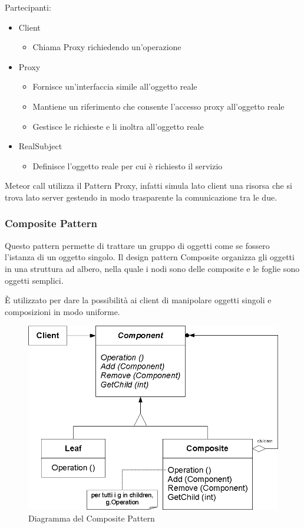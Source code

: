 	Partecipanti:
	\begin{itemize}
		\item Client
			\begin{itemize}
				\item Chiama Proxy richiedendo un'operazione
			\end{itemize}
		\item Proxy
			\begin{itemize}
				\item Fornisce un'interfaccia simile all'oggetto reale
				\item Mantiene un riferimento che consente l'accesso proxy all'oggetto reale
				\item Gestisce le richieste e li inoltra all'oggetto reale
			\end{itemize}
		\item RealSubject
			\begin{itemize}
				\item Definisce l'oggetto reale per cui è richiesto il servizio
			\end{itemize}
	\end{itemize}

Meteor call utilizza il Pattern Proxy, infatti simula lato client una risorsa che si trova lato server gestendo in modo trasparente la comunicazione tra le due.

\subsubsection{Composite Pattern}
Questo pattern permette di trattare un gruppo di oggetti come se fossero l'istanza di un oggetto singolo. Il design pattern Composite organizza gli oggetti in una struttura ad albero, nella quale i nodi sono delle composite e le foglie sono oggetti semplici.

È utilizzato per dare la possibilità ai client di manipolare oggetti singoli e composizioni in modo uniforme.

	\FloatBarrier
	\begin{figure}[ht]
		\centering
		\includegraphics[scale=0.45]{img/Composite_Pattern.png}
		\caption{Diagramma del Composite Pattern}
	\end{figure}


